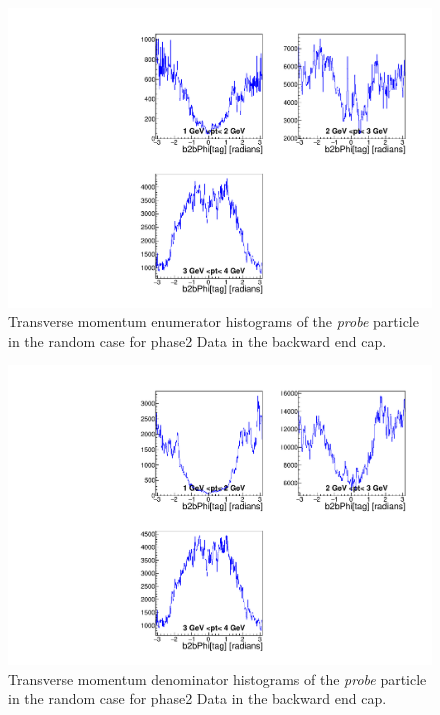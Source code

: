 \documentclass[a4paper,11pt,twosided,final,german,openbib,pdftex,listof=totoc,bibliography=totoc]{scrbook}
\begin{document}
\begin{appendix}
\begin{figure}[!htbp]
	\centering
	\includegraphics[width=\textwidth]{Plots/master/xPtMPhiRandomECE_Data}
	\caption[Transverse Momentum $\phi$ Random Backward End Cap Enumerator Histogram Phase2 Data]{Transverse momentum enumerator histograms of the \textit{probe} particle in the random case for phase2 Data in the backward end cap.}
	\label{plt:PtMPhiRandomECE_Data}
\end{figure}


\begin{figure}[!htbp]
	\centering
	\includegraphics[width=\textwidth]{Plots/master/xPtMPhiRandomECD_Data}
	\caption[Transverse Momentum $\phi$ Random Backward End Cap Denominator Histogram Phase2 Data]{Transverse momentum denominator histograms of the \textit{probe} particle in the random case for phase2 Data in the backward end cap.}
	\label{plt:PtMPhiRandomECD_Data}
\end{figure}







\end{appendix}
\end{document}
